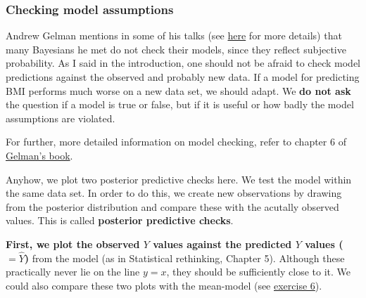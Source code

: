 \documentclass[
]{book}
\begin{document}
\subsubsection{Checking model assumptions}\label{check_model_bayes}

Andrew Gelman mentions in some of his talks (see \href{https://sites.stat.columbia.edu/gelman/research/published/philosophy_chapter.pdf}{here} for more details)
that many Bayesians he met do not check their models, since they reflect subjective probability.
As I said in the introduction, one should not be afraid to check model predictions against the observed
and probably new data. If a model for predicting BMI performs much worse on a new data set,
we should adapt. We \textbf{do not ask} the question if a model is true or false, but if it is useful or
how badly the model assumptions are violated.

For further, more detailed information on model checking, refer to chapter 6 of
\href{https://sites.stat.columbia.edu/gelman/book/BDA3.pdf}{Gelman's book}.

Anyhow, we plot two posterior predictive checks here.
We test the model within the same data set.
In order to do this, we create new observations
by drawing from the posterior distribution and compare these with the acutally
observed values. This is called \textbf{posterior predictive checks}.

\textbf{First, we plot the observed \(Y\) values against the predicted \(Y\) values (\(=\hat{Y}\))}
from the model (as in Statistical rethinking, Chapter 5).
Although these practically never lie on the line \(y=x\), they should be sufficiently
close to it. We could also compare these two plots with the mean-model (see \hyperref[exercise6_multiple_regression]{exercise 6}).
\end{document}
